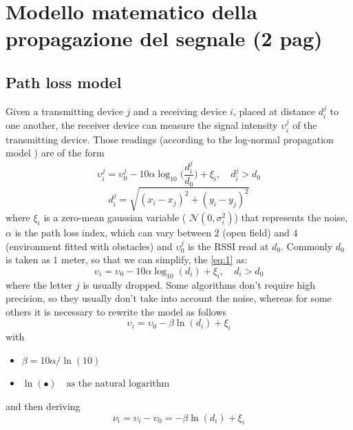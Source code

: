 \documentclass[12pt,twoside]{report}
\begin{document}
\clearpage

\chapter{Modello matematico della propagazione del segnale (2 pag)}
\section{Path loss model}
Given a transmitting device $j$ and a receiving device $i$, placed at distance $d_i^j$ to one another, the receiver device can measure the signal intensity $\upsilon_i^j$ of the transmitting device. Those readings (according to the log-normal propagation model  \cite{MUNOZ200923}) are of the form
\begin{equation}
\upsilon_i^j = \upsilon_0^j-10\alpha\log_{10}\bigg(\frac{d_i^j}{d_0}\bigg) + \xi_i, \quad d_i^j>d_0
\label{eq:1}
\end{equation}
\begin{equation}
    d_i^j=\sqrt{(x_i-x_j)^2+(y_i-y_j)^2}
\end{equation}
where $\xi_i$ is a zero-mean gaussian variable ( $\mathcal{N}(0,\sigma^2_i)$) that represents the noise, $\alpha$ is the path loss index, which can vary between $2$ (open field) and $4$ (environment fitted with obstacles) and $\upsilon_0^j$ is the RSSI read at $d_0$. Commonly $d_0$ is taken as $1$ meter, so that we can simplify, the \ref{eq:1} as:
\begin{equation}
\upsilon_i = \upsilon_0-10\alpha\log_{10}(d_i) + \xi_i, \quad d_i>d_0
\label{eq:2}
\end{equation}
where the letter $j$ is usually dropped.
Some algorithms don't require high precision, so they usually don't take into account the noise, whereas for some others it is necessary to rewrite the model as follows
\begin{equation}
\upsilon_i= \upsilon_0-\beta\ln(d_i) + \xi_i
\end{equation}
with
\begin{itemize}
    \item $\beta=10\alpha/\ln(10)$
    \item $\ln(\bullet)\quad \text{as the natural logarithm}$
\end{itemize}
and then deriving
\begin{equation}
\nu_i = \upsilon_i-\upsilon_0= -\beta\ln(d_i) + \xi_i
\label{eq:5}
\end{equation}
\clearpage
\end{document}
